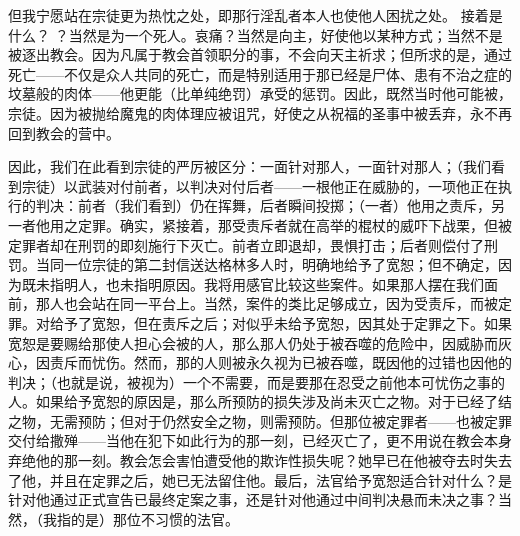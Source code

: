 但我宁愿站在宗徒更为热忱之处，即那行淫乱者本人也使他人困扰之处。 接着是什么？  ？当然是为一个死人。哀痛？当然是向主，好使他以某种方式；当然不是被逐出教会。因为凡属于教会首领职分的事，不会向天主祈求；但所求的是，通过死亡——不仅是众人共同的死亡，而是特别适用于那已经是尸体、患有不治之症的坟墓般的肉体——他更能（比单纯绝罚）承受的惩罚。因此，既然当时他可能被，宗徒。因为被抛给魔鬼的肉体理应被诅咒，好使之从祝福的圣事中被丢弃，永不再回到教会的营中。\par

因此，我们在此看到宗徒的严厉被区分：一面针对那人，一面针对那人；（我们看到宗徒）以武装对付前者，以判决对付后者——一根他正在威胁的，一项他正在执行的判决：前者（我们看到）仍在挥舞，后者瞬间投掷；（一者）他用之责斥，另一者他用之定罪。确实，紧接着，那受责斥者就在高举的棍杖的威吓下战栗，但被定罪者却在刑罚的即刻施行下灭亡。前者立即退却，畏惧打击；后者则偿付了刑罚。当同一位宗徒的第二封信送达格林多人时，明确地给予了宽恕；但不确定，因为既未指明人，也未指明原因。我将用感官比较这些案件。如果那人摆在我们面前，那人也会站在同一平台上。当然，案件的类比足够成立，因为受责斥，而被定罪。对给予了宽恕，但在责斥之后；对似乎未给予宽恕，因其处于定罪之下。如果宽恕是要赐给那使人担心会被的人，那么那人仍处于被吞噬的危险中，因威胁而灰心，因责斥而忧伤。然而，那的人则被永久视为已被吞噬，既因他的过错也因他的判决；（也就是说，被视为）一个不需要，而是要那在忍受之前他本可忧伤之事的人。如果给予宽恕的原因是，那么所预防的损失涉及尚未灭亡之物。对于已经了结之物，无需预防；但对于仍然安全之物，则需预防。但那位被定罪者——也被定罪交付给撒殚——当他在犯下如此行为的那一刻，已经灭亡了，更不用说在教会本身弃绝他的那一刻。教会怎会害怕遭受他的欺诈性损失呢？她早已在他被夺去时失去了他，并且在定罪之后，她已无法留住他。最后，法官给予宽恕适合针对什么？是针对他通过正式宣告已最终定案之事，还是针对他通过中间判决悬而未决之事？当然，（我指的是）那位不习惯的法官。\par

